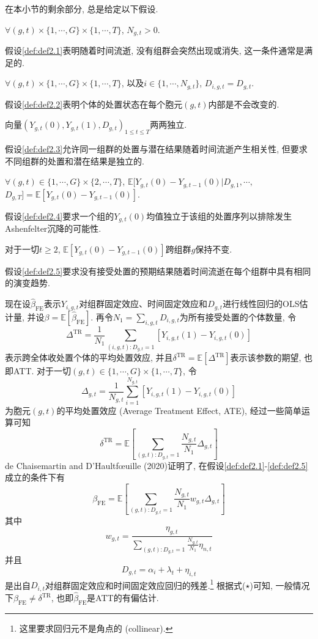 \documentclass[cn,blue,14pt,screen,bibstyle=gb7714-2015]{elegantnote}
\newcommand{\E}{\mathbb{E}}
\begin{document}
在本小节的剩余部分, 总是给定以下假设.

\begin{definition}[平衡组群]\label{def:def2.1}
$\forall (g,t)\times \{1,\cdots,G\}\times \{1,\cdots,T\}$, $N_{g,t}>0$.
\end{definition}
假设\ref{def:def2.1}表明随着时间流逝, 没有组群会突然出现或消失, 这一条件通常是满足的.

\begin{definition}[清晰设计]\label{def:def2.2}
$\forall (g,t)\times \{1,\cdots,G\}\times \{1,\cdots,T\}$, 以及$i\in\{1,\cdots,N_{g,t}\}$, $D_{i,g,t}=D_{g,t}$.
\end{definition}
假设\ref{def:def2.2}表明个体的处置状态在每个胞元$(g,t)$内部是不会改变的.

\begin{definition}[独立组群]\label{def:def2.3}
向量$(Y_{g,t}(0),Y_{g,t}(1),D_{g,t})_{1\leq t\leq T}$两两独立.
\end{definition}
假设\ref{def:def2.3}允许同一组群的处置与潜在结果随着时间流逝产生相关性, 但要求不同组群的处置和潜在结果是独立的.

\begin{definition}[强外生性]\label{def:def2.4}
$\forall (g,t)\in\{1,\cdots,G\}\times\{2,\cdots,T\}$, $\E[Y_{g,t}(0)-Y_{g,t-1}(0)|D_{g,1},\cdots,$ $D_{g,T}]=\E[Y_{g,t}(0)-Y_{g,t-1}(0)]$.
\end{definition}
假设\ref{def:def2.4}要求一个组的$Y_{g,t}(0)$均值独立于该组的处置序列以排除发生Ashenfelter沉降的可能性.

\begin{definition}[共同趋势]\label{def:def2.5}
对于一切$t\ge2$, $\E[Y_{g,t}(0)-Y_{g,t-1}(0)]$跨组群$g$保持不变.
\end{definition}
假设\ref{def:def2.5}要求没有接受处置的预期结果随着时间流逝在每个组群中具有相同的演变趋势.

现在设$\hat{\beta}_\text{FE}$表示$Y_{i,g,t}$对组群固定效应、时间固定效应和$D_{g,t}$进行线性回归的OLS估计量, 并设$\beta=\E[\hat{\beta}_\text{FE}]$. 再令$N_1=\sum_{i,g,t}D_{i,g,t}$为所有接受处置的个体数量, 令
$$\Delta^\text{TR}=\frac{1}{N_1}\sum_{(i,g,t):D_{g,t}=1}[Y_{i,g,t}(1)-Y_{i,g,t}(0)]$$
表示跨全体收处置个体的平均处置效应, 并且$\delta^\text{TR}=\E[\Delta^\text{TR}]$表示该参数的期望, 也即ATT. 对于一切$(g,t)\in \{1,\cdots,G\}\times\{1,\cdots,T\}$, 令
$$\Delta_{g,t}=\frac{1}{N_{g,t}}\sum_{i=1}^{N_{g,t}}[Y_{i,g,t}(1)-Y_{i,g,t}(0)]$$
为胞元$(g,t)$的平均处置效应 (Average Treatment Effect, ATE), 经过一些简单运算可知
$$\delta^\text{TR}=\E\left[\sum_{(g,t):D_{g,t}=1}\frac{N_{g,t}}{N_1}\Delta_{g,t}\right]$$
de Chaisemartin and D'Haultfœuille (2020)证明了, 在假设\ref{def:def2.1}-\ref{def:def2.5}成立的条件下有
\begin{equation}\label{eq2.1}
  \beta_\text{FE}=\E\left[\sum_{(g,t):D_{g,t}=1}\frac{N_{g,t}}{N_1}w_{g,t}\Delta_{g,t}\right] \tag{$\star$}
\end{equation}
其中
$$w_{g,t}=\frac{\eta_{g,t}}{\sum_{(g,t):D_{g,t}=1}\frac{N_{g,t}}{N_1}\eta_{n,t}}$$
并且
$$D_{g,t}=\alpha_i+\lambda_t+\eta_{i,t}$$
是出自$D_{i,t}$对组群固定效应和时间固定效应回归的残差.\footnote{这里要求回归元不是角点的 (collinear).} 根据式($\star$)可知, 一般情况下$\beta_\text{FE}\neq \delta^\text{TR}$, 也即$\hat{\beta}_\text{FE}$是ATT的有偏估计.
\end{document}
